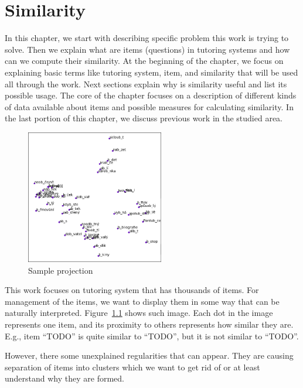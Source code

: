 \documentclass[
  print, %
  table,   %
  nolof,     %
  nolot,     %
  nocover,
  color,
  final,
]{fithesis3}
\begin{document}

\chapter{Similarity}


In this chapter, we start with describing specific problem this work is trying to solve. Then we explain what are items (questions) in tutoring systems and how can we compute their similarity. At the beginning of the chapter, we focus on explaining basic terms like tutoring system, item, and similarity that will be used all through the work. Next sections explain why is similarity useful and list its possible usage. The core of the chapter focuses on a description of different kinds of data available about items and possible measures for calculating similarity. In the last portion of this chapter, we discuss previous work in the studied area.


\begin{figure}
    \includegraphics[width=6cm]{img/sample_projection}
  \caption{Sample projection}
  \label{fig:sample_projection}
\end{figure}

This work focuses on tutoring system \umimeCesky{} that has thousands of items. For management of the items, we want to display them in some way that can be naturally interpreted. Figure~\ref{fig:sample_projection} shows such image. Each dot in the image represents one item, and its proximity to others represents how similar they are. E.g., item ``TODO'' is quite similar to ``TODO'', but it is not similar to ``TODO''.

However, there some unexplained regularities that can appear. They are causing separation of items into clusters which we want to get rid of or at least understand why they are formed.
\end{document}
